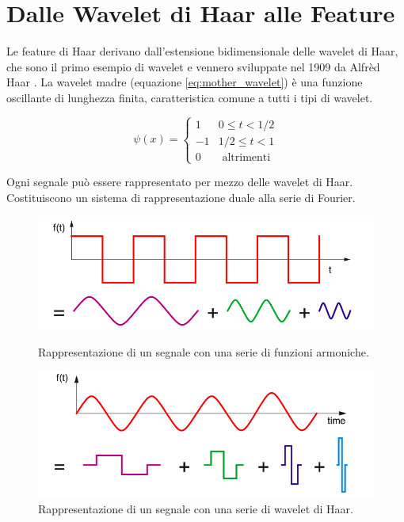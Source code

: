 \section{Dalle Wavelet di Haar alle Feature}
\label{sec:haar_wavelet}
Le feature di Haar derivano dall'estensione bidimensionale delle wavelet di Haar, che sono il primo esempio di wavelet e vennero sviluppate nel 1909 da Alfrèd Haar \cite{Haar10}.
La wavelet madre (equazione \ref{eq:mother_wavelet}) è una funzione oscillante di lunghezza finita, caratteristica comune a tutti i tipi di wavelet.

\begin{equation}
\label{eq:mother_wavelet}
    \psi(x) =
    \begin{cases}
        1 & 0 \leq t < 1/2 \\
        -1 & 1/2 \leq t < 1 \\
        0 & \text{ altrimenti }
    \end{cases}
\end{equation}

Ogni segnale può essere rappresentato per mezzo delle wavelet di Haar. Costituiscono un sistema di rappresentazione duale alla serie di Fourier.

\begin{figure}[!htb]
    \includegraphics[width=\linewidth]{img/fourier_rapresentation.png}
    \caption{Rappresentazione di un segnale con una serie di funzioni armoniche.}
    \label{fig:awesome_image1}
    \endminipage\hfill
    \includegraphics[width=\linewidth]{img/haar_rapresentation.png}
    \caption{Rappresentazione di un segnale con una serie di wavelet di Haar.}
    \label{fig:awesome_image2}
    \endminipage
\end{figure}


